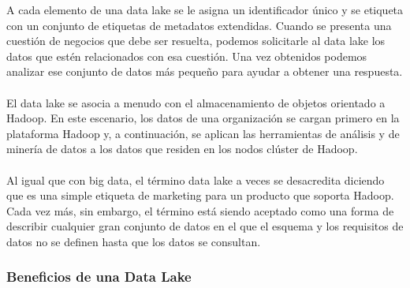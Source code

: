 \documentclass[11pt,a4paper]{article}
\begin{document}
		A cada elemento de una data lake se le asigna un identificador único y se etiqueta con un conjunto de etiquetas de metadatos extendidas. Cuando se presenta una cuestión de negocios que debe ser resuelta, podemos solicitarle al data lake los datos que estén relacionados con esa cuestión. Una vez obtenidos podemos analizar ese conjunto de datos más pequeño para ayudar a obtener una respuesta.\\
		\\
		El data lake se asocia a menudo con el almacenamiento de objetos orientado a Hadoop. En este escenario, los datos de una organización se cargan primero en la plataforma Hadoop y, a continuación, se aplican las herramientas de análisis y de minería de datos a los datos que residen en los nodos clúster de Hadoop.\\
		\\
		Al igual que con big data, el término data lake a veces se desacredita diciendo que es una simple etiqueta de marketing para un producto que soporta Hadoop. Cada vez más, sin embargo, el término está siendo aceptado como una forma de describir cualquier gran conjunto de datos en el que el esquema y los requisitos de datos no se definen hasta que los datos se consultan.\cite{DLake01:Online}

\subsubsection{Beneficios de una Data Lake}
			
\end{document}
